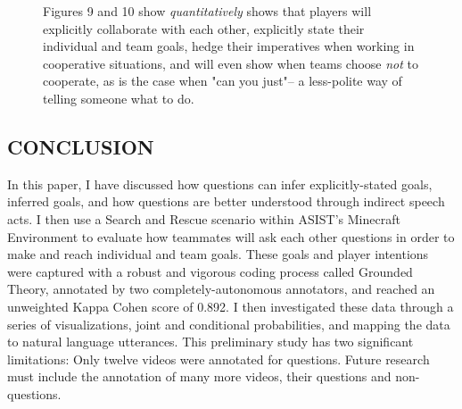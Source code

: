 

\begin{figure}[h!]
    \centering
    \caption{Figures 9 and 10 show \emph{quantitatively} shows that players will explicitly collaborate with each other, explicitly state their individual and team goals, hedge their imperatives when working in cooperative situations, and will even show when teams choose \emph{not} to cooperate, as is the case when "can you just"-- a less-polite way of telling someone what to do.
}
\end{figure}



\newpage

\subsection{CONCLUSION}
In this paper, I have discussed how questions can infer explicitly-stated goals, inferred goals, and how questions are better understood through indirect speech acts. I then use a Search and Rescue scenario within ASIST's Minecraft Environment to evaluate how teammates will ask each other questions in order to make and reach individual and team goals. These goals and player intentions were captured with a robust and vigorous coding process called Grounded Theory, annotated by two completely-autonomous annotators, and reached an unweighted Kappa Cohen score of 0.892. I then investigated these data through a series of visualizations, joint and conditional probabilities, and mapping the data to natural language utterances. This preliminary study has two significant limitations: Only twelve videos were annotated for questions. Future research must include the annotation of many more videos, their questions and non-questions. 

